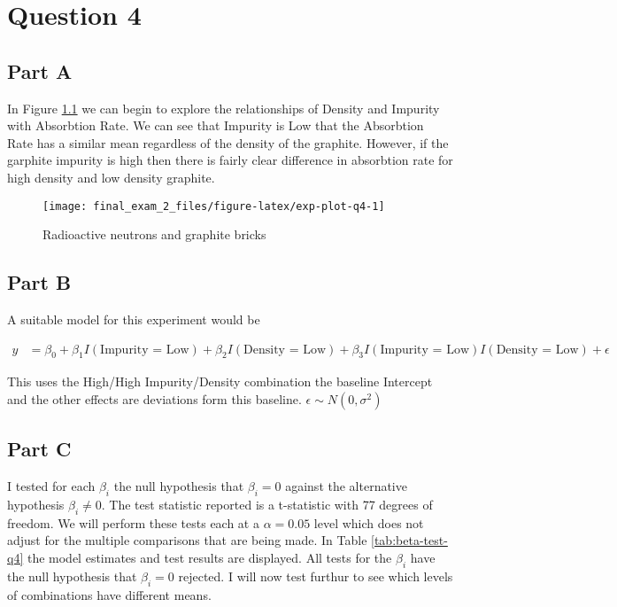 \documentclass[]{book}
\begin{document}
\hypertarget{question-4}{%
\chapter{Question 4}\label{question-4}}

\hypertarget{part-a-3}{%
\section{Part A}\label{part-a-3}}

In Figure \ref{fig:exp-plot-q4} we can begin to explore the relationships of Density and Impurity with Absorbtion Rate. We can see that Impurity is Low that the Absorbtion Rate has a similar mean regardless of the density of the graphite. However, if the garphite impurity is high then there is fairly clear difference in absorbtion rate for high density and low density graphite.

\begin{figure}

{\centering \texttt{[image: final\_exam\_2\_files/figure-latex/exp-plot-q4-1]} 

}

\caption{Radioactive neutrons and graphite bricks}\label{fig:exp-plot-q4}
\end{figure}

\hypertarget{part-b-3}{%
\section{Part B}\label{part-b-3}}

A suitable model for this experiment would be

\begin{align}
  y &= \beta_0 + \beta_1 I(\text{Impurity = Low}) + \beta_2 I(\text{Density = Low}) + \beta_3 I(\text{Impurity = Low}) I(\text{Density = Low}) + \epsilon
\end{align}

This uses the High/High Impurity/Density combination the baseline Intercept and the other effects are deviations form this baseline. \(\epsilon \sim N(0, \sigma^2)\)

\hypertarget{part-c-3}{%
\section{Part C}\label{part-c-3}}

I tested for each \(\beta_i\) the null hypothesis that \(\beta_i = 0\) against the alternative hypothesis \(\beta_i \neq 0\). The test statistic reported is a t-statistic with 77 degrees of freedom. We will perform these tests each at a \(\alpha = 0.05\) level which does not adjust for the multiple comparisons that are being made. In Table \ref{tab:beta-test-q4} the model estimates and test results are displayed. All tests for the \(\beta_i\) have the null hypothesis that \(\beta_i = 0\) rejected. I will now test furthur to see which levels of combinations have different means.
\end{document}
